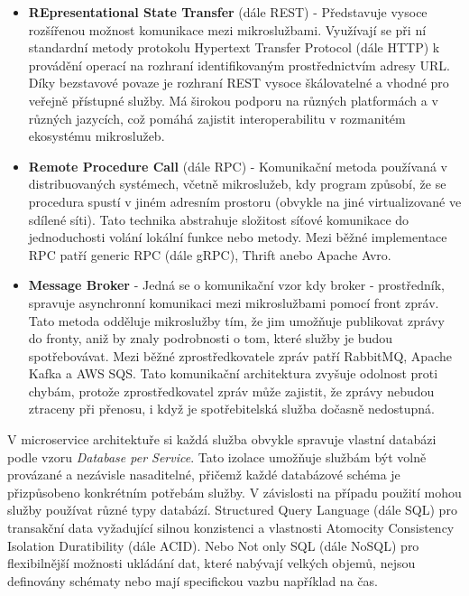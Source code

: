 \begin{itemize}
    \item \textbf{REpresentational State Transfer} (dále REST) - Představuje vysoce rozšířenou možnost komunikace mezi mikroslužbami. Využívají se při ní standardní metody protokolu Hypertext Transfer Protocol (dále HTTP) k provádění operací na rozhraní identifikovaným prostřednictvím adresy URL. Díky bezstavové povaze je rozhraní REST vysoce škálovatelné a vhodné pro veřejně přístupné služby. Má širokou podporu na různých platformách a v různých jazycích, což pomáhá zajistit interoperabilitu v rozmanitém ekosystému mikroslužeb.
    \item \textbf{Remote Procedure Call} (dále RPC) - Komunikační metoda používaná v distribuovaných systémech, včetně mikroslužeb, kdy program způsobí, že se procedura spustí v jiném adresním prostoru (obvykle na jiné virtualizované ve sdílené síti). Tato technika abstrahuje složitost síťové komunikace do jednoduchosti volání lokální funkce nebo metody. Mezi běžné implementace RPC patří generic RPC (dále gRPC), Thrift anebo Apache Avro. \cite{Sazanavets2022}
    \item \textbf{Message Broker} - Jedná se o komunikační vzor kdy broker - prostředník, spravuje asynchronní komunikaci mezi mikroslužbami pomocí front zpráv. Tato metoda odděluje mikroslužby tím, že jim umožňuje publikovat zprávy do fronty, aniž by znaly podrobnosti o tom, které služby je budou spotřebovávat. Mezi běžné zprostředkovatele zpráv patří RabbitMQ, Apache Kafka a AWS SQS. Tato komunikační architektura zvyšuje odolnost proti chybám, protože zprostředkovatel zpráv může zajistit, že zprávy nebudou ztraceny při přenosu, i když je spotřebitelská služba dočasně nedostupná. 
\end{itemize}


V microservice architektuře si každá služba obvykle spravuje vlastní databázi podle vzoru \emph{Database per Service}. Tato izolace umožňuje službám být volně provázané a nezávisle nasaditelné, přičemž každé databázové schéma je přizpůsobeno konkrétním potřebám služby. V závislosti na případu použití mohou služby používat různé typy databází. Structured Query Language (dále SQL) pro transakční data vyžadující silnou konzistenci a vlastnosti Atomocity Consistency Isolation Duratibility (dále ACID). Nebo Not only SQL (dále NoSQL) pro flexibilnější možnosti ukládání dat, které nabývají velkých objemů, nejsou definovány schématy nebo mají specifickou vazbu například na čas. 

